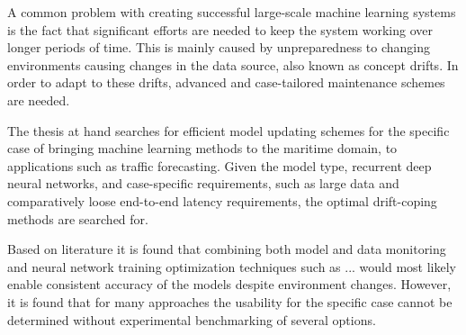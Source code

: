 
A common problem with creating successful large-scale machine learning systems is the fact that significant efforts are needed to keep the system working over longer periods of time. This is mainly caused by unpreparedness to changing environments causing changes in the data source, also known as concept drifts. In order to adapt to these drifts, advanced and case-tailored maintenance schemes are needed.

The thesis at hand searches for efficient model updating schemes for the specific case of bringing machine learning methods to the maritime domain, to applications such as traffic forecasting. Given the model type, recurrent deep neural networks, and case-specific requirements, such as large data and comparatively loose end-to-end latency requirements, the optimal drift-coping methods are searched for.

Based on literature it is found that combining both model and data monitoring and neural network training optimization techniques such as ... would most likely enable consistent accuracy of the models despite environment changes. However, it is found that for many approaches the usability for the specific case cannot be determined without experimental benchmarking of several options.  %

  
